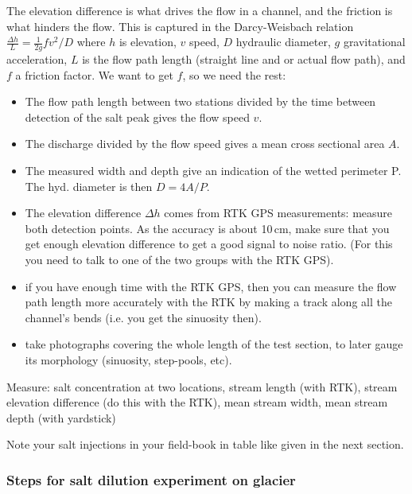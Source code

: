 \documentclass[DIV=15,halfparskip,11pt,headinclude]{scrartcl}
\begin{document}
The elevation difference is what drives the flow in a channel, and the
friction is what hinders the flow.  This is captured in the
Darcy-Weisbach relation $\frac{\Delta h}{L} = \frac{1}{2g} f v^2/D$ where $h$ is
elevation, $v$ speed, $D$ hydraulic diameter, $g$ gravitational
acceleration, $L$ is the flow path length (straight line and or actual flow path),
and $f$ a friction factor.  We want to get $f$, so we
need the rest:

\begin{itemize}
\item The flow path length between two stations divided
by the time between detection of the salt peak gives the flow speed $v$.
\item The discharge divided by the flow speed gives a mean cross sectional
  area $A$.
\item The measured width and depth give an indication of the wetted
perimeter P.  The hyd. diameter is then $D = 4A/P$.
\item The elevation difference $\Delta h$ comes from RTK GPS measurements: measure both
detection points.  As the accuracy is about 10\,cm,
make sure that you get enough elevation difference to get a good
signal to noise ratio.  (For this you need to talk to one of the two
groups with the RTK GPS).
\item if you have enough time with the RTK GPS, then you can measure the
  flow path length more accurately with the RTK by making a track
  along all the channel's bends (i.e. you get the sinuosity then).
\item take photographs covering the whole length of the test section,
  to later gauge its morphology (sinuosity, step-pools, etc).
\end{itemize}



Measure: salt concentration at two locations, stream length (with
RTK), stream elevation difference (do this with the RTK), mean stream
width, mean stream depth (with yardstick)

Note your salt injections in your field-book in table like given in the next section.


\subsubsection{Steps for salt dilution experiment on glacier}
\label{sec-2-2}
\end{document}
